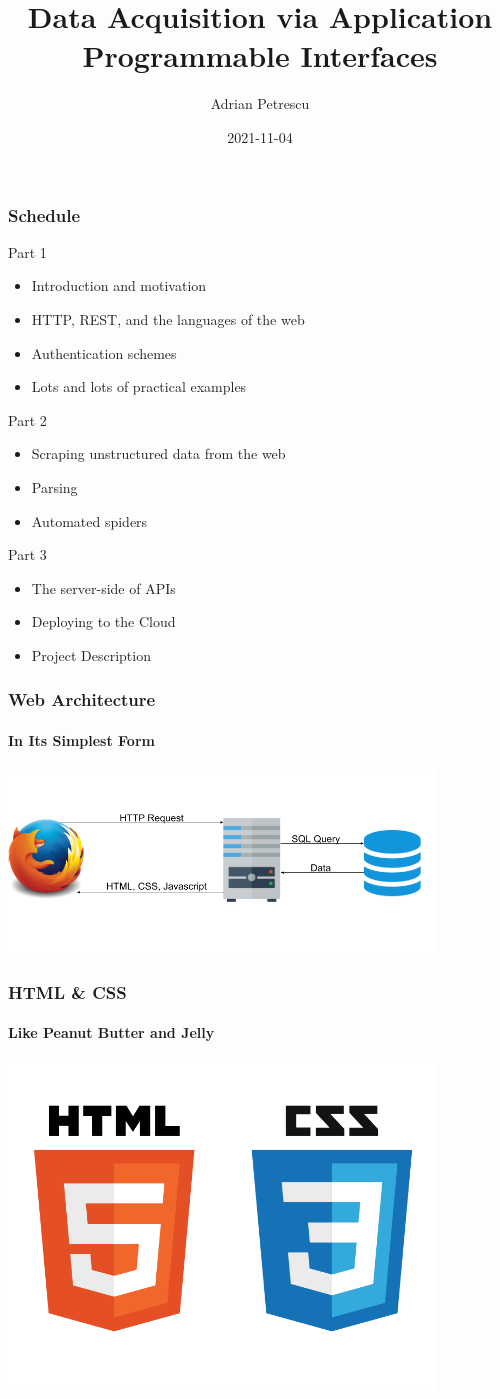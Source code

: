 \documentclass[dvipsnames]{beamer}
\title[Data Acquisition via APIs]{Data Acquisition via Application Programmable Interfaces}
\author{Adrian Petrescu}
\institute{Kinaxis}
\date{2021-11-04}
\begin{document}
\frame{\titlepage}


\begin{frame}
  \frametitle{Schedule}
  
  Part 1
  \begin{itemize}
    \item Introduction and motivation
    \item HTTP, REST, and the languages of the web
    \item Authentication schemes
    \item Lots and lots of practical examples
  \end{itemize}

  \alert{Part 2}
  \begin{itemize}
    \item Scraping unstructured data from the web
    \item Parsing 
    \item Automated spiders
  \end{itemize}

  Part 3
  \begin{itemize}
    \item The server-side of APIs
    \item Deploying to the Cloud
    \item Project Description
  \end{itemize}
\end{frame}


\begin{frame}
  \frametitle{Web Architecture}
  \framesubtitle{In Its Simplest Form}
  \includegraphics[width=320pt]{img/web-architecture-1.png}
\end{frame}


\begin{frame}
  \frametitle{HTML \& CSS}
  \framesubtitle{Like Peanut Butter and Jelly}
  \includegraphics[width=320pt]{img/html-css.png}
\end{frame}
\end{document}
